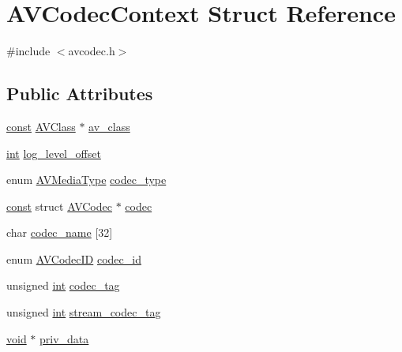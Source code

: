 \hypertarget{struct_a_v_codec_context}{}\section{A\+V\+Codec\+Context Struct Reference}
\label{struct_a_v_codec_context}


{\ttfamily \#include $<$avcodec.\+h$>$}

\subsection*{Public Attributes}
\begin{DoxyCompactItemize}
\item 
\hyperlink{getopt1_8c_a2c212835823e3c54a8ab6d95c652660e}{const} \hyperlink{struct_a_v_class}{A\+V\+Class} $\ast$ \hyperlink{struct_a_v_codec_context_a90622d3af2a9abba986a1c9f7ca21b16}{av\+\_\+class}
\item 
\hyperlink{xmltok_8h_a5a0d4a5641ce434f1d23533f2b2e6653}{int} \hyperlink{struct_a_v_codec_context_a7f9e4467c3394228bc3c9f308a42303c}{log\+\_\+level\+\_\+offset}
\item 
enum \hyperlink{group__lavu__misc_ga9a84bba4713dfced21a1a56163be1f48}{A\+V\+Media\+Type} \hyperlink{struct_a_v_codec_context_a3f99ca3115c44e6d7772c9384faf15e6}{codec\+\_\+type}
\item 
\hyperlink{getopt1_8c_a2c212835823e3c54a8ab6d95c652660e}{const} struct \hyperlink{struct_a_v_codec}{A\+V\+Codec} $\ast$ \hyperlink{struct_a_v_codec_context_a6e606effa68724cae2ef5cc05f7fd9cb}{codec}
\item 
char \hyperlink{struct_a_v_codec_context_a8a85cb13e730b57b121e7aac3306ec87}{codec\+\_\+name} \mbox{[}32\mbox{]}
\item 
enum \hyperlink{group__lavc__core_gaadca229ad2c20e060a14fec08a5cc7ce}{A\+V\+Codec\+ID} \hyperlink{struct_a_v_codec_context_adc5f65d6099fd8339c1580c091777223}{codec\+\_\+id}
\item 
unsigned \hyperlink{xmltok_8h_a5a0d4a5641ce434f1d23533f2b2e6653}{int} \hyperlink{struct_a_v_codec_context_a2c974557671dd459674b170c5e64d79a}{codec\+\_\+tag}
\item 
unsigned \hyperlink{xmltok_8h_a5a0d4a5641ce434f1d23533f2b2e6653}{int} \hyperlink{struct_a_v_codec_context_ae008a28c9ab5820840bd67982019e98d}{stream\+\_\+codec\+\_\+tag}
\item 
\hyperlink{sound_8c_ae35f5844602719cf66324f4de2a658b3}{void} $\ast$ \hyperlink{struct_a_v_codec_context_af3379123060ad8cc9c321c29af4f8360}{priv\+\_\+data}

\end{DoxyCompactItemize}
